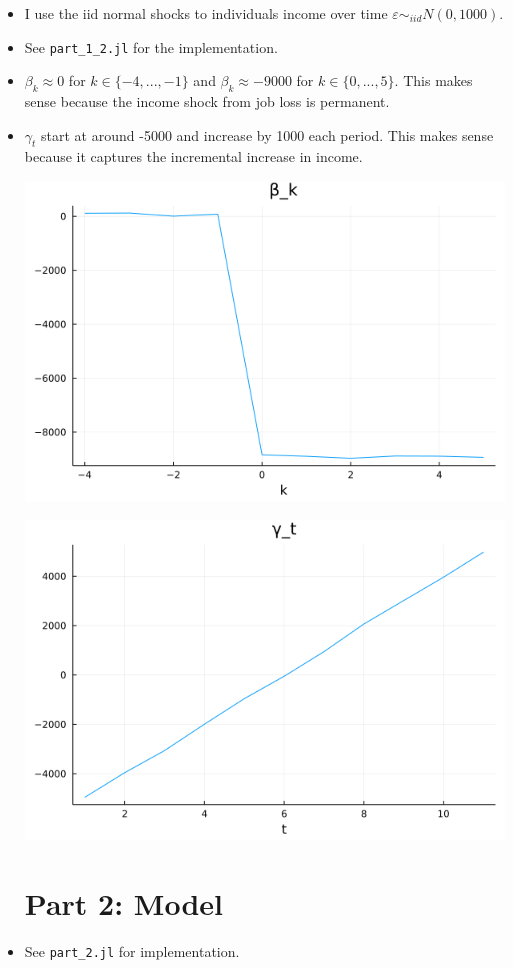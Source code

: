 \documentclass{article}
\begin{document}
\begin{itemize}
\item I use the iid normal shocks to individuals income over time $\varepsilon \sim_{iid} N(0, 1000)$.

\item See \texttt{part\_1\_2.jl} for the implementation.

\item $\beta_k \approx 0$ for $k \in \{-4,..., -1\}$ and $\beta_k \approx -9000$ for $k \in \{0,..., 5\}$.  This makes sense because the income shock from job loss is permanent.

\item $\gamma_t$ start at around -5000 and increase by 1000 each period. This makes sense because it captures the incremental increase in income.



\includegraphics[scale=0.5]{part_1_2_beta}

\includegraphics[scale=0.5]{part_1_2_gamma}

\pagebreak

\section{Part 2: Model}

\item See \texttt{part\_2.jl} for implementation.

\end{itemize}
\end{document}
